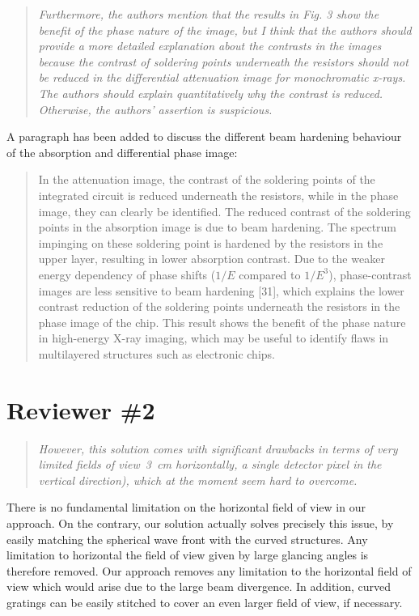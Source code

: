 \documentclass[a4paper,english]{scrartcl}
\newenvironment{reviewerquote}{\begin{quote}\itshape}{\end{quote}}
\begin{document}
\begin{reviewerquote}
    Furthermore, the authors mention that the results in Fig. 3 show the benefit of the phase nature of the image, but I think that the authors should provide a more detailed explanation about the contrasts in the images because the contrast of soldering points underneath the resistors should not be reduced in the differential attenuation image for monochromatic x-rays. The authors should explain quantitatively why the contrast is reduced. Otherwise, the authors' assertion is suspicious.
\end{reviewerquote}
A paragraph has been added to discuss the different beam hardening behaviour of
the absorption and differential phase image:
\begin{quote}
In the attenuation image, the contrast of the soldering points of the integrated circuit is reduced underneath the
resistors, while in the phase image, they can clearly be identified. The reduced contrast
of the soldering points in the absorption image is due to beam hardening. The spectrum
impinging on these soldering point is hardened by the resistors in the upper layer, resulting
in lower absorption contrast. Due to the weaker energy dependency of phase
shifts ($1/E$
compared to $1/E^3$), phase-contrast images are less sensitive to beam hardening [31], which
explains the lower contrast reduction of the soldering points underneath the resistors in the
phase image of the chip. This result shows the benefit of the phase nature in high-energy
X-ray imaging, which may be useful to identify flaws in multilayered structures such as
electronic chips.
\end{quote}

\section*{Reviewer \#2}
\begin{reviewerquote}
    However, this solution comes with significant drawbacks in terms of very
    limited fields of view~\SI{3}{\centi\metre} horizontally, a single detector pixel in the vertical direction), which at the moment seem hard to overcome.
\end{reviewerquote}
There is no fundamental limitation on the horizontal field of view in our
approach. On the contrary, our solution actually solves precisely this
issue, by easily matching the spherical wave front with the curved
structures. Any limitation to horizontal the field of view given by large glancing
angles is therefore removed. 
Our approach removes any limitation to the horizontal field of view which would arise due to the large beam divergence. In addition, curved gratings can be easily stitched to cover an even larger field of view, if necessary.
\end{document}
